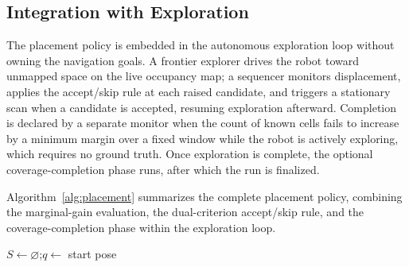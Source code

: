 \documentclass[sensors,article,submit,pdftex,moreauthors]{Definitions/mdpi}
\begin{document}
\subsection{Integration with Exploration}
\label{sec:integration}

The placement policy is embedded in the autonomous exploration loop without
owning the navigation goals. A frontier explorer drives the robot toward
unmapped space on the live occupancy map; a sequencer monitors displacement,
applies the accept/skip rule at each raised candidate, and triggers a stationary
scan when a candidate is accepted, resuming exploration afterward. Completion is
declared by a separate monitor when the count of known cells fails to increase by
a minimum margin over a fixed window while the robot is actively exploring, which
requires no ground truth. Once exploration is complete, the optional
coverage-completion phase runs, after which the run is finalized.

Algorithm~\ref{alg:placement} summarizes the complete placement policy, combining
the marginal-gain evaluation, the dual-criterion accept/skip rule, and the
coverage-completion phase within the exploration loop.

\begin{algorithm}[H]
\caption{Visibility-based stop-and-scan placement}
\label{alg:placement}
\SetAlgoLined
\DontPrintSemicolon
{}
$S \leftarrow \varnothing$;\quad $q \leftarrow$ start pose\;
\;
\end{algorithm}
\end{document}

